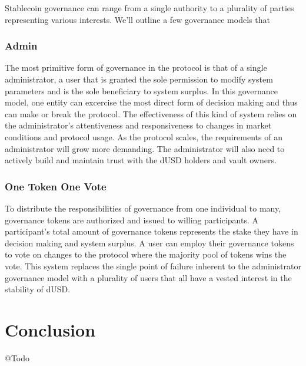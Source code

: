 \documentclass[12pt]{article}
\begin{document}
Stablecoin governance can range from a single authority to a plurality of parties representing various interests. We'll outline a few governance models that

\subsubsection{Admin}
The most primitive form of governance in the protocol is that of a single administrator, a user that is granted the sole permission to modify system parameters and is the sole beneficiary to system surplus. In this governance model, one entity can excercise the most direct form of decision making and thus can make or break the protocol. The effectiveness of this kind of system relies on the administrator's attentiveness and responsiveness to changes in market conditions and protocol usage. As the protocol scales, the requirements of an administrator will grow more demanding. The administrator will also need to actively build and maintain trust with the dUSD holders and vault owners.

\subsubsection{One Token One Vote}
To distribute the responsibilities of governance from one individual to many, governance tokens are authorized and issued to willing participants. A participant's total amount of governance tokens represents the stake they have in decision making and system surplus. A user can employ their governance tokens to vote on changes to the protocol where the majority pool of tokens wins the vote. This system replaces the single point of failure inherent to the administrator governance model with a plurality of users that all have a vested interest in the stability of dUSD.

\section{Conclusion}
\begin{flushleft}
	\color{red} @Todo
\end{flushleft}
\end{document}
